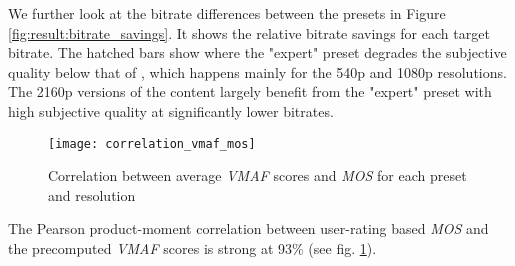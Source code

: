 We further look at the bitrate differences between the presets in Figure \ref{fig:result:bitrate_savings}. It shows the relative bitrate savings for each target bitrate. The hatched bars show where the "expert" preset degrades the subjective quality below that of , which happens mainly for the 540p and 1080p resolutions. The 2160p versions of the content largely benefit from the "expert" preset with high subjective quality at significantly lower bitrates.


\begin{figure}[htb!]
	\centering
	\texttt{[image: correlation\_vmaf\_mos]}
	\caption{Correlation between average \textit{VMAF} scores and \textit{MOS} for each preset and resolution}
	\label{fig:result:correlation_vmaf_mos}
\end{figure}

The Pearson product-moment correlation between user-rating based \textit{MOS} and the precomputed \textit{VMAF} scores is strong at 93\% (see fig. \ref{fig:result:correlation_vmaf_mos}).
\\
